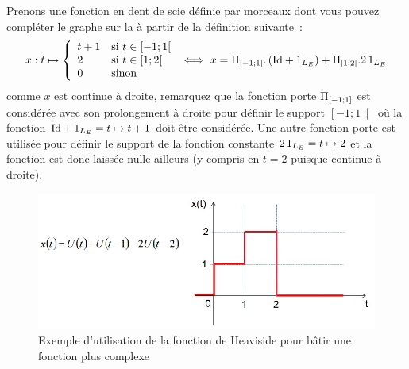 \begin{remark}{}
      \begin{exemple}
        Prenons une fonction en dent de scie définie par morceaux dont
        vous pouvez compléter le graphe sur la
         à partir de la définition
        suivante~:
        \begin{equation*}
         x : t \mapsto \left\{\begin{array}{ll} {t+1} & {\text{si } t\in\left[-1 ; 1\right[}\\ {2} & {\text{si }t\in\left[1 ; 2\right[}\\ {0} & {\text{sinon}}\\ \end{array}\right.
          \iff x = \Pi_{\left[-1 ; 1\right]}.\left(\mathrm{Id}+\mathrm{1}_{L_E}\right)+\Pi_{\left[1 ; 2\right]}.2\,\mathrm{1}_{L_E}
        \end{equation*}
        comme $x$ est continue à droite, remarquez que la fonction
        porte $\Pi_{\left[-1 ; 1\right]}$ est considérée avec son prolongement à
        droite pour définir le support $\left[-1 ; 1\right[$ où la
        fonction $\mathrm{Id}+\mathrm{1}_{L_E}=t\mapsto t+1$ doit être
        considérée. Une autre fonction porte est utilisée pour définir
        le support de la fonction constante
        $2\,\mathrm{1}_{L_E}=t\mapsto 2$ et la fonction est donc laissée
        nulle ailleurs (y compris en $t=2$ puisque continue à droite).
        \begin{figure}[htbp]
          \centering
          \includegraphics[scale=0.5]{images/Utilisation_Heaviside.jpg}
          \caption{Exemple d'utilisation de la fonction de Heaviside
            pour bâtir une fonction plus complexe}
          \label{fig:approx_escalier}
	\end{figure}


\end{exemple}
\end{remark}
